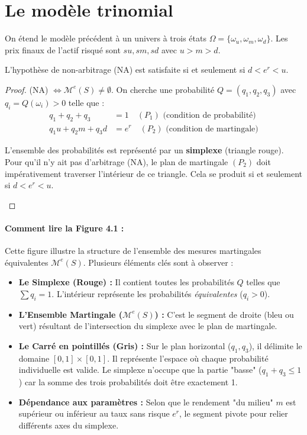\section{Le modèle trinomial}
On étend le modèle précédent à un univers à trois états $\Omega = \{\omega_u, \omega_m, \omega_d\}$. Les prix finaux de l'actif risqué sont $su, sm, sd$ avec $u > m > d$.

\begin{proposition}
L'hypothèse de non-arbitrage (NA) est satisfaite si et seulement si $d < e^r < u$.
\end{proposition}

\begin{proof}

(NA) $\iff \mathcal{M}^e(S) \neq \emptyset$. On cherche une probabilité $Q=(q_1, q_2, q_3)$ avec $q_i = Q(\omega_i) > 0$ telle que :
\begin{align}
    q_1 + q_2 + q_3 &= 1 \quad (P_1) \text{ (condition de probabilité)} \\
    q_1 u + q_2 m + q_3 d &= e^r \quad (P_2) \text{ (condition de martingale)}
\end{align}

\begin{tcolorbox}[title=Visualisation géométrique de l'arbitrage, colback=yellow!10!white, colframe=yellow!50!black]
L'ensemble des probabilités est représenté par un \textbf{simplexe} (triangle rouge). Pour qu'il n'y ait pas d'arbitrage (NA), le plan de martingale $(P_2)$ doit impérativement traverser l'intérieur de ce triangle. Cela se produit si et seulement si $d < e^r < u$.
\end{tcolorbox}
\end{proof}

\paragraph{Comment lire la Figure 4.1 :}
Cette figure illustre la structure de l'ensemble des mesures martingales équivalentes $\mathcal{M}^e(S)$. Plusieurs éléments clés sont à observer :
\begin{itemize}
    \item \textbf{Le Simplexe (Rouge) :} Il contient toutes les probabilités $Q$ telles que $\sum q_i = 1$. L'intérieur représente les probabilités \textit{équivalentes} ($q_i > 0$).
    \item \textbf{L'Ensemble Martingale ($\mathcal{M}^e(S)$) :} C'est le segment de droite (bleu ou vert) résultant de l'intersection du simplexe avec le plan de martingale.
    \item \textbf{Le Carré en pointillés (Gris) :} Sur le plan horizontal ($q_1, q_3$), il délimite le domaine $[0,1] \times [0,1]$. Il représente l'espace où chaque probabilité individuelle est valide. Le simplexe n'occupe que la partie "basse" ($q_1+q_3 \le 1$) car la somme des trois probabilités doit être exactement 1.
    \item \textbf{Dépendance aux paramètres :} Selon que le rendement "du milieu" $m$ est supérieur ou inférieur au taux sans risque $e^r$, le segment pivote pour relier différents axes du simplexe.
\end{itemize}

